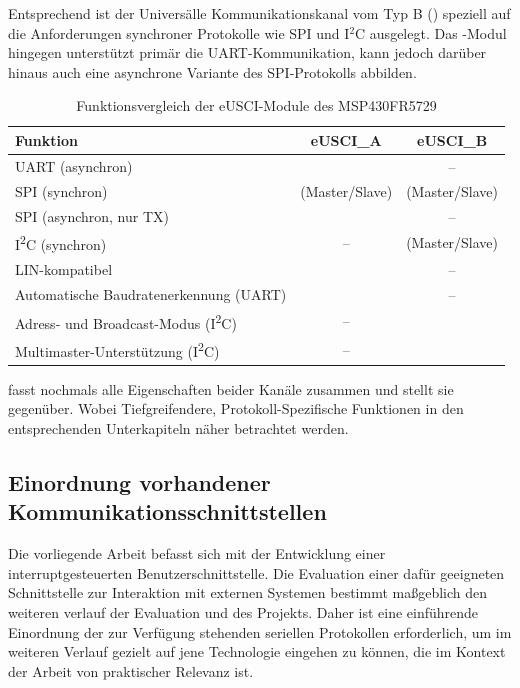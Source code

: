 \newpage
Entsprechend ist der Univers\"alle Kommunikationskanal vom Typ B () speziell auf die Anforderungen synchroner Protokolle wie SPI und I$^{2}$C ausgelegt. Das -Modul hingegen unterst\"utzt prim\"ar die UART-Kommunikation, kann jedoch dar\"uber hinaus auch eine asynchrone Variante des SPI-Protokolls abbilden. 

\begin{table}[h!]
	\small
	\centering
	\begin{tabular}{|l|c|c|}
		\hline
		\textbf{Funktion} & \textbf{eUSCI\_A} & \textbf{eUSCI\_B} \\\hline
		UART (asynchron) & \checkmark & -- \\\hline
		SPI (synchron) & \checkmark (Master/Slave) & \checkmark (Master/Slave) \\\hline
		SPI (asynchron, nur TX) & \checkmark & -- \\\hline
		I\textsuperscript{2}C (synchron) & -- & \checkmark (Master/Slave) \\\hline
		LIN-kompatibel & \checkmark & -- \\\hline
		Automatische Baudratenerkennung (UART) & \checkmark & -- \\\hline
		Adress- und Broadcast-Modus (I\textsuperscript{2}C) & -- & \checkmark \\\hline
		Multimaster-Unterst\"utzung (I\textsuperscript{2}C) & -- & \checkmark \\\hline
	\end{tabular}
	\caption{Funktionsvergleich der eUSCI-Module des MSP430FR5729\\}
	\label{tab:eusci-vergleich}
\end{table}

 fasst nochmals alle Eigenschaften beider Kan\"ale zusammen und stellt sie gegen\"uber. Wobei Tiefgreifendere, Protokoll-Spezifische Funktionen in den entsprechenden Unterkapiteln n\"aher betrachtet werden.

\subsection{Einordnung vorhandener Kommunikationsschnittstellen}

Die vorliegende Arbeit befasst sich mit der Entwicklung einer interruptgesteuerten Benutzerschnittstelle. Die Evaluation einer daf\"ur geeigneten Schnittstelle zur Interaktion mit externen  Systemen bestimmt ma{\ss}geblich den weiteren verlauf der Evaluation und des Projekts. Daher ist eine einf\"uhrende Einordnung der zur Verf\"ugung stehenden seriellen Protokollen erforderlich, um im weiteren Verlauf gezielt auf jene Technologie eingehen zu k\"onnen, die im Kontext der Arbeit von praktischer Relevanz ist.

